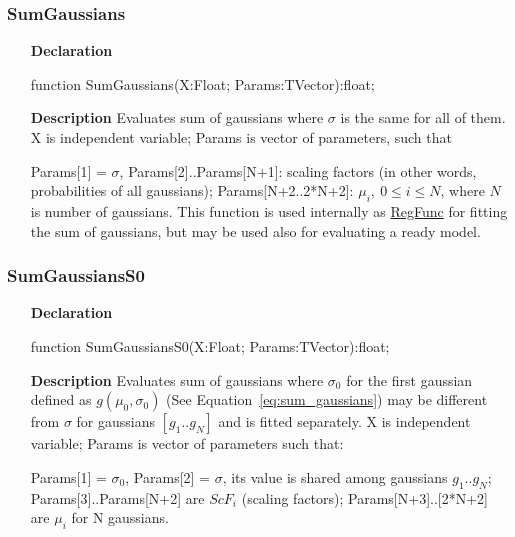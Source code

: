 \documentclass[12pt,a4paper,oneside]{report}
\newcommand{\declarationitem}[1]{\textbf{#1}}
\newcommand{\descriptiontitle}[1]{\textbf{#1}}
\begin{document}
\subsubsection{SumGaussians}
\label{ugauss-SumGaussians}
\begin{itemize}\item[\declarationitem{Declaration}\hfill]
	\begin{flushleft}
		\begin{ttfamily}
			function SumGaussians(X:Float; Params:TVector):float;\end{ttfamily}
		
	\end{flushleft}
	\item[\descriptiontitle{Description}]
	Evaluates sum of gaussians where $\sigma$ is the same for all of them. X is independent variable; Params is vector of parameters, such that 
	
	Params[1] = $\sigma$, Params[2]..Params[N+1]: scaling factors (in other words, probabilities of all gaussians); Params[N+2..2*N+2]: $\mu_i,\ 0 \le i \le N$, where $N$ is number of gaussians. This function is used internally as \hyperref[utypes-TRegFunc]{RegFunc} for fitting the sum of gaussians, but may be used also for evaluating a ready model.
\end{itemize}
\subsubsection{SumGaussiansS0}
\label{ugauss-SumGaussiansS0}
\begin{itemize}\item[\declarationitem{Declaration}\hfill]
	\begin{flushleft}
		\begin{ttfamily}
			function SumGaussiansS0(X:Float; Params:TVector):float;\end{ttfamily}
	\end{flushleft}
	\item[\descriptiontitle{Description}]
	Evaluates sum of gaussians where $\sigma_0$ for the first gaussian defined as $g(\mu_0,\sigma_0)$ (See Equation~\ref{eq:sum_gaussians}) may be different from $\sigma$ for gaussians $[g_1..g_N]$ and is fitted separately. X is independent variable; Params is vector of parameters such that:
	
	Params[1] = $\sigma_0$, Params[2] = $\sigma$, its value is shared among gaussians $g_1..g_N$; Params[3]..Params[N+2] are $ScF_i$ (scaling factors); Params[N+3]..[2*N+2] are $\mu_i$ for N gaussians.
\end{itemize}
\end{document}
